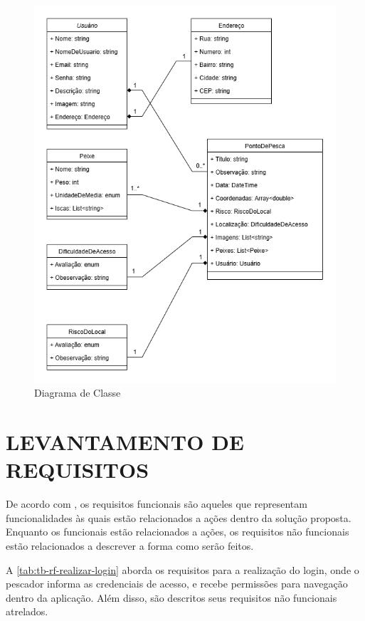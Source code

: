 \begin{figure}[H]
    \centering
    \caption{Diagrama de Classe}
    \label{fig:casoDeUso}
    \includegraphics[scale=0.70]{./dados/figuras/diagrama-de-classe.png}
\end{figure}

\section{LEVANTAMENTO DE REQUISITOS}\label{sec:levantamentoderequisitos}

De acordo com , os requisitos funcionais são aqueles que representam funcionalidades às quais estão relacionados a ações dentro da solução proposta. Enquanto os funcionais estão relacionados a ações, os requisitos não funcionais estão relacionados a descrever a forma como serão feitos.

A \autoref{tab:tb-rf-realizar-login} aborda os requisitos para a realização do login, onde o pescador informa as credenciais de acesso, e recebe permissões para navegação dentro da aplicação. Além disso, são descritos seus requisitos não funcionais atrelados.

